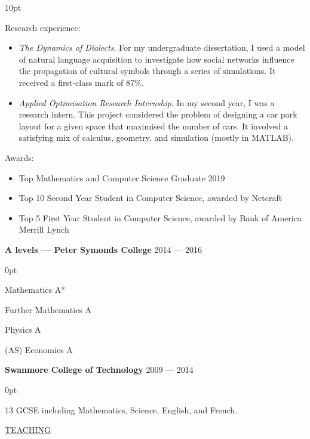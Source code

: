 \documentclass{article}
\renewcommand{\emph}[1]{\textit{#1}}
\newenvironment{tight-list}[1]{
  \vspace{5pt}
  \begin{adjustwidth}{15pt}{0pt}
  \begin{itemize}
    \setlength{\itemsep}{#1}
    \setlength{\parskip}{0pt}
    \setlength{\parsep}{0pt} 
}
{
  \end{itemize}
  \end{adjustwidth}
  \vspace{15pt}
}
\begin{document}
\begin{tight-list}{10pt}
\item Research experience:
\begin{itemize}
  \item \emph{The Dynamics of Dialects}. For my undergraduate dissertation, I used a model of natural language acquisition to investigate how social networks influence the propagation of cultural symbols through a series of simulations. It received a first-class mark of 87\%.
  \item \emph{Applied Optimisation Research Internship}. In my second year, I was a research intern. This project considered the problem of designing a car park layout for a given space that maximised the number of cars. It involved a satisfying mix of calculus, geometry, and simulation (mostly in MATLAB).
\end{itemize}

\item Awards:
\begin{itemize}
  \item Top Mathematics and Computer Science Graduate 2019
  \item Top 10 Second Year Student in Computer Science, awarded by Netcraft
  \item Top 5 First Year Student in Computer Science, awarded by Bank of America Merrill Lynch
\end{itemize}
\end{tight-list}

\textbf{A levels --- Peter Symonds College} \hfill 2014 --- 2016
\begin{tight-list}{0pt}
\item Mathematics A*
\item Further Mathematics A
\item Physics A
\item (AS) Economics A
\end{tight-list}

\textbf{Swanmore College of Technology} \hfill 2009 --- 2014
\begin{tight-list}{0pt}
\item 13 GCSE including Mathematics, Science, English, and French.
\end{tight-list}

\vspace{5pt}

\uline{{\large TEACHING}\hfill}
\vspace{10pt}
\end{document}
